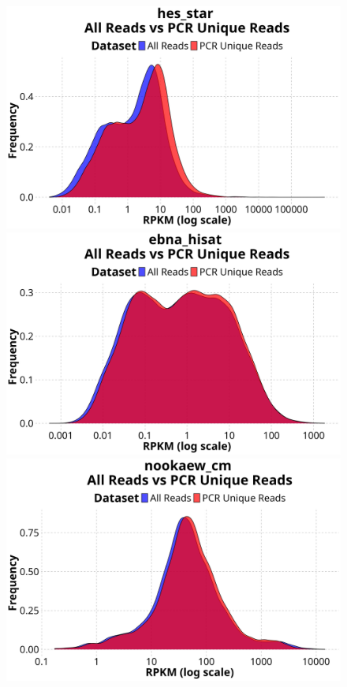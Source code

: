 \documentclass[12pt]{article}
\begin{document}
\begin{figure}[htpb]
    \centering
    \begin{minipage}[t]{0.32\textwidth}
        \centering
        \includegraphics[width=\textwidth]{./plots/hes_star/Plots/rpkm_density.png}
    \end{minipage}%
    \hfill
    \begin{minipage}[t]{0.32\textwidth}
        \centering
        \includegraphics[width=\textwidth]{./plots/ebna_hisat/Plots/rpkm_density.png}
    \end{minipage}%
    \hfill
    \begin{minipage}[t]{0.32\textwidth}
        \centering
        \includegraphics[width=\textwidth]{./plots/nookaew_cm/Plots/rpkm_density.png}

\end{minipage}
\end{figure}
\end{document}
